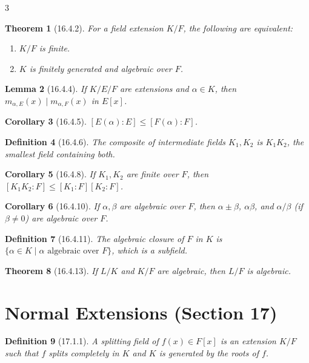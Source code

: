 \documentclass[10pt,landscape]{article}
\newtheorem{theorem}{Theorem}[section]
\newtheorem{definition}[theorem]{Definition}
\newtheorem{lemma}[theorem]{Lemma}
\newtheorem{corollary}[theorem]{Corollary}
\begin{document}
\begin{multicols}{3}
\begin{theorem}[16.4.2]
For a field extension $K/F$, the following are equivalent:
\begin{enumerate}
\item $K/F$ is finite.
\item $K$ is finitely generated and algebraic over $F$.
\end{enumerate}
\end{theorem}

\begin{lemma}[16.4.4]
If $K/E/F$ are extensions and $\alpha\in K$, then $m_{\alpha,E}(x)\mid m_{\alpha,F}(x)$ in $E[x]$.
\end{lemma}

\begin{corollary}[16.4.5]
$[E(\alpha):E]\le [F(\alpha):F]$.
\end{corollary}

\begin{definition}[16.4.6]
The composite of intermediate fields $K_1,K_2$ is $K_1K_2$, the smallest field containing both.
\end{definition}

\begin{corollary}[16.4.8]
If $K_1,K_2$ are finite over $F$, then $[K_1K_2:F]\le [K_1:F][K_2:F]$.
\end{corollary}

\begin{corollary}[16.4.10]
If $\alpha,\beta$ are algebraic over $F$, then $\alpha\pm\beta$, $\alpha\beta$, and $\alpha/\beta$ (if $\beta\neq0$) are algebraic over $F$.
\end{corollary}

\begin{definition}[16.4.11]
The algebraic closure of $F$ in $K$ is $\{\alpha\in K\mid \alpha\text{ algebraic over }F\}$, which is a subfield.
\end{definition}

\begin{theorem}[16.4.13]
If $L/K$ and $K/F$ are algebraic, then $L/F$ is algebraic.
\end{theorem}

\section{Normal Extensions (Section 17)}

\begin{definition}[17.1.1]
A splitting field of $f(x)\in F[x]$ is an extension $K/F$ such that $f$ splits completely in $K$ and $K$ is generated by the roots of $f$.
\end{definition}


\end{multicols}
\end{document}

